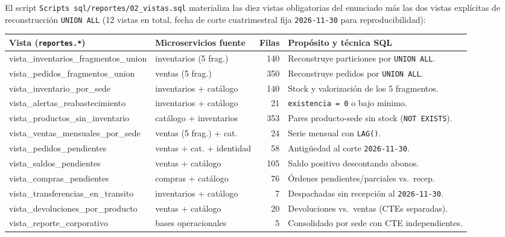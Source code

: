 \documentclass[11pt,oneside]{article}
\begin{document}
El script \texttt{Scripts sql/reportes/02\_vistas.sql} materializa las diez
vistas obligatorias del enunciado m\'as las dos vistas expl\'icitas de
reconstrucci\'on \texttt{UNION ALL} (12 vistas en total, fecha de corte
cuatrimestral fija \texttt{2026-11-30} para reproducibilidad):

\begin{center}
\renewcommand{\arraystretch}{1.22}
{\footnotesize
\begin{tabularx}{\linewidth}{@{} >{\ttfamily}p{5.55cm} >{\sffamily}p{3.6cm} r >{\raggedright\arraybackslash}X @{}}
\toprule
\rowcolor{fondo}
{\sffamily\bfseries Vista (\texttt{reportes.*})} & {\sffamily\bfseries Microservicios fuente} & {\sffamily\bfseries Filas} & {\sffamily\bfseries Prop\'osito y t\'ecnica SQL} \\
\midrule
vista\_inventarios\_fragmentos\_union & inventarios (5 frag.) & 140 & Reconstruye particiones por \texttt{UNION ALL}. \\
vista\_pedidos\_fragmentos\_union & ventas (5 frag.) & 350 & Reconstruye pedidos por \texttt{UNION ALL}. \\
vista\_inventario\_por\_sede & inventarios + cat\'alogo & 140 & Stock y valorizaci\'on de los 5 fragmentos. \\
vista\_alertas\_reabastecimiento & inventarios + cat\'alogo & 21 & \texttt{existencia = 0} o bajo m\'inimo. \\
vista\_productos\_sin\_inventario & cat\'alogo + inventarios & 353 & Pares producto-sede sin stock (\texttt{NOT EXISTS}). \\
vista\_ventas\_mensuales\_por\_sede & ventas (5 frag.) + cat. & 24 & Serie mensual con \texttt{LAG()}. \\
vista\_pedidos\_pendientes & ventas + cat. + identidad & 58 & Antig\"uedad al corte \texttt{2026-11-30}. \\
vista\_saldos\_pendientes & ventas + cat\'alogo & 105 & Saldo positivo descontando abonos. \\
vista\_compras\_pendientes & compras + cat\'alogo & 76 & \'Ordenes pendientes/parciales vs.\ recep. \\
vista\_transferencias\_en\_transito & inventarios + cat\'alogo & 7 & Despachadas sin recepci\'on al \texttt{2026-11-30}. \\
vista\_devoluciones\_por\_producto & ventas + cat\'alogo & 20 & Devoluciones vs.\ ventas (CTEs separadas). \\
vista\_reporte\_corporativo & 5 bases operacionales & 5 & Consolidado por sede con CTE independientes. \\
\bottomrule
\end{tabularx}}
\end{center}
\end{document}
